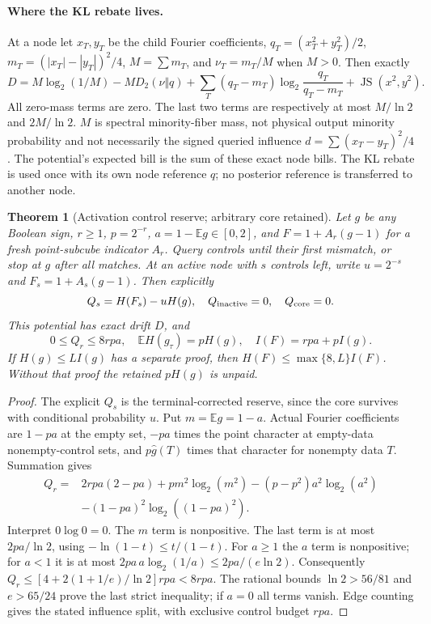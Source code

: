 \documentclass{article}
\newtheorem{theorem}{Theorem}
\begin{document}
\paragraph{Where the KL rebate lives.}
At a node let $x_T,y_T$ be the child Fourier coefficients,
$q_T=(x_T^2+y_T^2)/2$, $m_T=(|x_T|-|y_T|)^2/4$,
$M=\sum m_T$, and $\nu_T=m_T/M$ when $M>0$. Then exactly
\[
D=M\log_2(1/M)-M D_2(\nu\Vert q)
 +\sum_T(q_T-m_T)\log_2\frac{q_T}{q_T-m_T}
 +\operatorname{JS}(x^2,y^2).
\]
All zero-mass terms are zero. The last two terms are respectively at most
$M/\ln2$ and $2M/\ln2$. $M$ is spectral minority-fiber mass, not
physical output minority probability and not necessarily the signed
queried influence $d=\sum(x_T-y_T)^2/4$.
The potential's expected bill is the sum of these exact node bills.
The KL rebate is used once with its own node reference $q$; no posterior
reference is transferred to another node.

\begin{theorem}[Activation control reserve; arbitrary core retained]
Let $g$ be any Boolean sign, $r\ge1$, $p=2^{-r}$,
$a=1-\mathbb Eg\in[0,2]$, and $F=1+A_r(g-1)$ for a fresh
point-subcube indicator $A_r$. Query controls until their first mismatch,
or stop at $g$ after all matches. At an active node with $s$ controls left,
write $u=2^{-s}$ and $F_s=1+A_s(g-1)$. Then explicitly
\[
Q_s=H(F_s)-uH(g),\quad Q_{\rm inactive}=0,
\quad Q_{\rm core}=0.
\]
This potential has exact drift $D$, and
\[
0\le Q_r\le8rpa,\quad
\mathbb EH(g_\tau)=pH(g),\quad
I(F)=rpa+pI(g).
\]
If $H(g)\le L I(g)$ has a separate proof, then
$H(F)\le\max\{8,L\}I(F)$. Without that proof the retained
$pH(g)$ is unpaid.
\end{theorem}
\begin{proof}
The explicit $Q_s$ is the terminal-corrected reserve, since the core
survives with conditional probability $u$. Put $m=\mathbb Eg=1-a$.
Actual Fourier coefficients are $1-pa$ at the empty set,
$-pa$ times the point character at empty-data nonempty-control sets,
and $p\widehat g(T)$ times that character for nonempty data $T$.
Summation gives
\begin{align*}
Q_r={}&2rpa(2-pa)+p m^2\log_2(m^2)
 -(p-p^2)a^2\log_2(a^2)\\
&-(1-pa)^2\log_2((1-pa)^2).
\end{align*}
Interpret $0\log0=0$. The $m$ term is nonpositive. The last term
is at most $2pa/\ln2$, using $-\ln(1-t)\le t/(1-t)$.
For $a\ge1$ the $a$ term is nonpositive; for $a<1$ it is at most
$2pa\,a\log_2(1/a)\le2pa/(e\ln2)$.
Consequently $Q_r\le[4+2(1+1/e)/\ln2]rpa<8rpa$.
The rational bounds $\ln2>56/81$ and $e>65/24$ prove the last strict
inequality; if $a=0$ all terms vanish. Edge counting gives the stated
influence split, with exclusive control budget $rpa$.
\end{proof}
\end{document}

